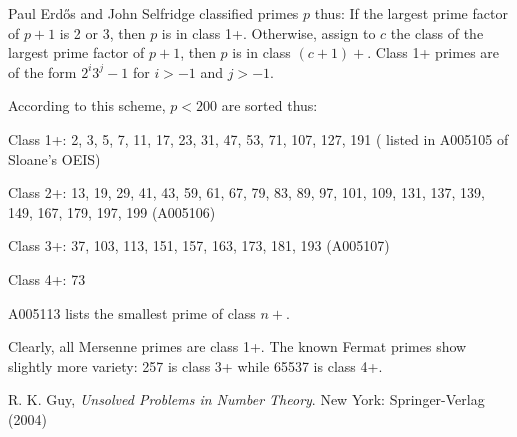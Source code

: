 \documentclass[12pt]{article}
\begin{document}
Paul Erd\H{o}s and John Selfridge classified primes $p$ thus: If the largest prime factor of $p + 1$ is 2 or 3, then $p$ is in class 1+. Otherwise, assign to $c$ the class of the largest prime factor of $p + 1$, then $p$ is in class $(c + 1)+$. Class 1+ primes are of the form $2^i3^j - 1$ for $i > -1$ and $j > -1$.

According to this scheme, $p < 200$ are sorted thus:

Class 1+: 2, 3, 5, 7, 11, 17, 23, 31, 47, 53, 71, 107, 127, 191 ( listed in A005105 of Sloane's OEIS)

Class 2+: 13, 19, 29, 41, 43, 59, 61, 67, 79, 83, 89, 97, 101, 109, 131, 137, 139, 149, 167, 179, 197, 199 (A005106)

Class 3+: 37, 103, 113, 151, 157, 163, 173, 181, 193 (A005107)

Class 4+: 73

A005113 lists the smallest prime of class $n+$.

Clearly, all Mersenne primes are class 1+. The known Fermat primes show slightly more variety: 257 is class 3+ while 65537 is class 4+.

\begin{thebibliography}{1}
 R. K. Guy, {\it Unsolved Problems in Number Theory}. New York: Springer-Verlag (2004)
\end{thebibliography}


\end{document}
